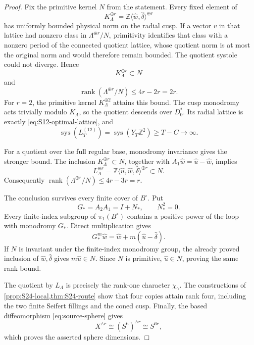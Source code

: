 \documentclass[11pt,letterpaper]{article}
\numberwithin{equation}{section}
\theoremstyle{definition}
\theoremstyle{remark}
\newcommand{\Z}{\mathbb Z}
\newcommand{\sys}{\operatorname{sys}}
\newcommand{\rank}{\operatorname{rank}}
\begin{document}
\begin{proof}
Fix the primitive kernel \(N\) from the statement.  Every fixed element of
\[
 K_\Lambda^{\oplus r}
 =\Z\langle\widehat w,\widehat\delta\rangle^{\oplus r}
\]
has uniformly bounded physical norm on the radial cusp.  If a vector
\(v\) in that lattice had nonzero class in
\(\Lambda^{\oplus r}/N\), primitivity identifies that class with a nonzero
period of the connected quotient lattice, whose quotient norm is at most
the original norm and would therefore remain bounded.  The quotient
systole could not diverge.  Hence
\[
 K_\Lambda^{\oplus r}\subset N
\]
and
\[
 \rank(\Lambda^{\oplus r}/N)\leq4r-2r=2r.
\]
For \(r=2\), the primitive kernel \(K_\Lambda^{\oplus2}\) attains this
bound.  The cusp monodromy acts trivially modulo \(K_\Lambda\), so the
quotient descends over \(D_0^*\).  Its radial lattice is exactly
\cref{eq:S12-optimal-lattice}, and
\[
 \sys(L_T^{(12)})=\sys(Y_T\Z^2)\geq T-C\longrightarrow\infty.
\]

For a quotient over the full regular base, monodromy invariance gives the
stronger bound.  The inclusion \(K_\Lambda^{\oplus r}\subset N\), together
with \(A_1\widehat w=\widehat u-\widehat w\), implies
\[
 L_\Lambda^{\oplus r}
 =\Z\langle\widehat u,\widehat w,\widehat\delta\rangle^{\oplus r}
 \subset N.
\]
Consequently
\(\rank(\Lambda^{\oplus r}/N)\leq4r-3r=r\).

The conclusion survives every finite cover of \(B^\circ\).  Put
\[
 G_*=A_2A_1=I+N_*,
 \qquad N_*^2=0.
\]
Every finite-index subgroup of \(\pi_1(B^\circ)\) contains a positive
power of the loop with monodromy \(G_*\).  Direct multiplication gives
\[
 G_*^m\widehat w
 =\widehat w+m(\widehat u-\widehat\delta).
\]
If \(N\) is invariant under the finite-index monodromy group, the already
proved inclusion of \(\widehat w,\widehat\delta\) gives
\(m\widehat u\in N\).  Since \(N\) is primitive,
\(\widehat u\in N\), proving the same rank bound.

The quotient by \(L_\Lambda\) is precisely the rank-one character
\(\chi_\gamma\).  The constructions of
\cref{prop:S24-local,thm:S24-route} show that four copies attain rank
four, including the two finite Seifert fillings and the coned cusp.
Finally, the based diffeomorphism \cref{eq:source-sphere} gives
\[
 X^{\wedge r}\cong(S^6)^{\wedge r}\cong S^{6r},
\]
which proves the asserted sphere dimensions.
\end{proof}
\end{document}
